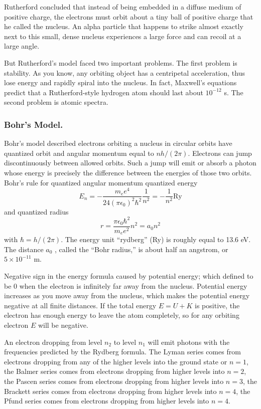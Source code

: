 \documentclass[../main.tex]{subfiles}
\begin{document}
Rutherford concluded that instead of being embedded in a diffuse medium of positive charge, the electrons must orbit about a tiny ball of positive charge that he called the nucleus. An alpha particle that happens to strike almost exactly next to this small, dense nucleus experiences a large force and can recoil at a large angle.

But Rutherford's model faced two important problems. The first problem is stability. As you know, any orbiting object has a centripetal acceleration, thus lose energy and rapidly spiral into the nucleus. In fact, Maxwell's equations predict that a Rutherford-style hydrogen atom should last about $10^{-12} $ s. The second problem is atomic spectra. 

\subsubsection*{Bohr's Model.} Bohr's model described electrons orbiting a nucleus in circular orbits have quantized orbit and angular momentum equal to $nh/(2\pi)$. Electrons can jump discontinuously between allowed orbits. Such a jump will emit or absorb a photon whose energy is precisely the difference between the energies of those two orbits. Bohr's rule for quantized angular momentum quantized energy
\begin{equation*}
        E_n=-\frac{m_ee^4}{24(\pi\epsilon_0)^2\hbar^2}\frac{1}{n^2}=-\frac{1}{n^2}\text{Ry}
\end{equation*}
and quantized radius
\begin{equation*}
    r=\frac{\pi\epsilon_0\hbar^2}{m_ee^2}n^2=a_0n^2
\end{equation*}
with $\hbar=h/(2\pi)$. The energy unit “rydberg” (Ry) is roughly equal to 13.6 eV. The distance $a_0$ , called the “Bohr radius,” is about half an angstrom, or $5 \times 10^{-11}$ m. 

Negative sign in the energy formula caused by potential energy; which defined to be 0 when the electron is infinitely far away from the nucleus. Potential energy increases as you move away from the nucleus, which makes the potential energy negative at all finite distances. If the total energy $E = U + K$ is positive, the electron has enough energy to leave the atom completely, so for any orbiting electron $E$ will be negative. 

An electron dropping from level $n_2$ to level $n_1$ will emit photons with the frequencies predicted by the Rydberg formula. The Lyman series comes from electrons dropping from any of the higher levels into the ground state or $n=1$, the Balmer series comes from electrons dropping from higher levels into $n = 2$, the Pascen series comes from electrons dropping from higher levels into $n = 3$, the Brackett series comes from electrons dropping from higher levels into $n = 4$, the Pfund series comes from electrons dropping from higher levels into $n = 4$.
\end{document}
